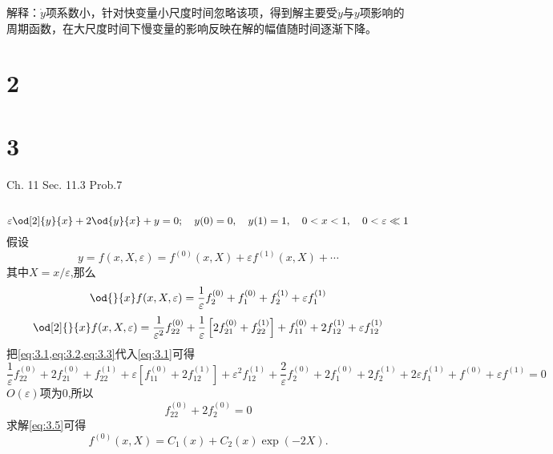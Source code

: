 \documentclass[12pt]{article}
\begin{document}
解释：$\dot{y}$项系数小，针对快变量小尺度时间忽略该项，得到解主要受$\ddot{y}$与$y$项影响的周期函数，在大尺度时间下慢变量的影响反映在解的幅值随时间逐渐下降。

\section{2}



\section{3}
Ch. 11 Sec. 11.3 Prob.7 

\subsection{}

\begin{equation}
	\varepsilon \od[2]{y}{x} +2 \od{y}{x} +y=0 ;\quad y(0) = 0,\quad y(1) = 1, \quad 0<x<1, \quad 0<\varepsilon \ll 1
	\label{eq:3.1}
\end{equation}
假设
\begin{equation}
	y = f(x,X,\varepsilon) = f^{(0)}(x,X) + \varepsilon f^{(1)}(x,X) + \cdots
	\label{eq:3.2}
\end{equation}
其中$X=x/\varepsilon$,那么
\begin{equation}
	\od{}{x} f(x,X,\varepsilon) = \frac{1}{\varepsilon} f^{(0)}_2 + f^{(0)}_1 + f^{(1)}_2 + \varepsilon f^{(1)}_1
	\label{eq:3.3}
\end{equation}
\begin{equation}
	\od[2]{}{x} f(x,X,\varepsilon) = \frac{1}{\varepsilon^2} f^{(0)}_{22} + \frac{1}{\varepsilon} \left[ 2f^{(0)}_{21} + f^{(1)}_{22} \right] + f^{(0)}_{11} + 2 f^{(1)}_{12} + \varepsilon f^{(1)}_{12}
	\label{eq:3.4}
\end{equation}
把\cref{eq:3.1,eq:3.2,eq:3.3}代入\cref{eq:3.1}可得
\begin{equation}
	\frac{1}{\varepsilon} f^{(0)}_{22} + 2f^{(0)}_{21} + f^{(1)}_{22}  + \varepsilon \left[ f^{(0)}_{11} + 2 f^{(1)}_{12} \right] + \varepsilon^2 f^{(1)}_{12} + \frac{2}{\varepsilon} f^{(0)}_2 + 2f^{(0)}_1 + 2f^{(1)}_2 + 2\varepsilon f^{(1)}_1 + f^{(0)} + \varepsilon f^{(1)}= 0
\end{equation}
$O(\varepsilon)$项为$0$,所以
\begin{equation}
	f^{(0)}_{22} + 2f^{(0)}_2 = 0
	\label{eq:3.5}
\end{equation}
求解\cref{eq:3.5}可得
\begin{equation}
	f^{(0)}(x,X) = C_1(x) + C_2(x) \exp{(-2X)}.
	\label{eq:3.6}
\end{equation}
\end{document}
